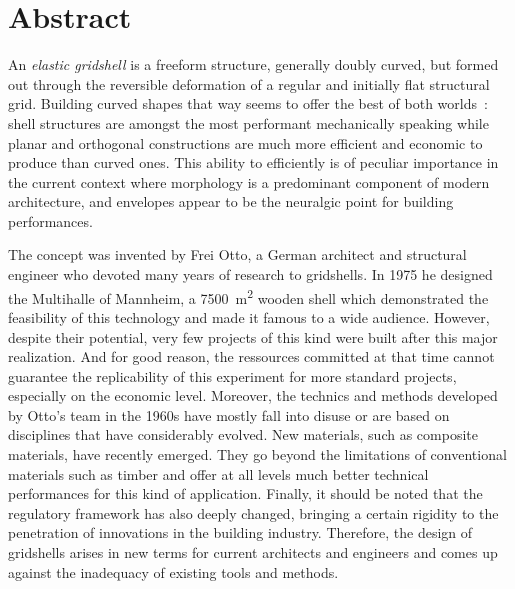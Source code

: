 
\cleardoublepage
\chapter*{Abstract}
\vspace{-16pt}
{
\small
An \emph{elastic gridshell} is a freeform structure, generally doubly curved, but formed out through the reversible deformation of a regular and initially flat structural grid. Building curved shapes that way seems to offer the best of both worlds~: shell structures are amongst the most performant mechanically speaking while planar and orthogonal constructions are much more efficient and economic to produce than curved ones. This ability to  efficiently is of peculiar importance in the current context where morphology is a predominant component of modern architecture, and envelopes appear to be the neuralgic point for building performances.

The concept was invented by Frei Otto, a German architect and structural engineer who devoted many years of research to gridshells. In 1975 he designed the Multihalle of Mannheim, a \SI{7500}{m^2} wooden shell which demonstrated the feasibility of this technology and made it famous to a wide audience. However, despite their potential, very few projects of this kind were built after this major realization. And for good reason, the ressources committed at that time cannot guarantee the replicability of this experiment for more standard projects, especially on the economic level. Moreover, the technics and methods developed by Otto's team in the 1960s have mostly fall into disuse or are based on disciplines that have considerably evolved. New materials, such as composite materials, have recently emerged. They go beyond the limitations of conventional materials such as timber and offer at all levels much better technical performances for this kind of application. Finally, it should be noted that the regulatory framework has also deeply changed, bringing a certain rigidity to the penetration of innovations in the building industry. Therefore, the design of gridshells arises in new terms for current architects and engineers and comes up against the inadequacy of existing tools and methods.

}
